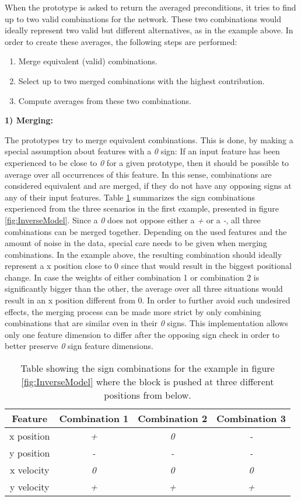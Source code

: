 When the prototype is asked to return the averaged preconditions, it tries to find up to two valid combinations for the network. These two combinations would ideally represent two valid but different alternatives, as in the example above. 
In order to create these averages, the following steps are performed:
\begin{enumerate}
\item Merge equivalent (valid) combinations.
\item Select up to two merged combinations with the highest contribution.
\item Compute averages from these two combinations.
\end{enumerate}

\textbf{1) Merging:}

The prototypes try to merge equivalent combinations. This is done, by making a special assumption about features with a \textit{0} sign: If an input feature has been experienced to be close to \textit{0} for a given prototype, then it should be possible to average over all occurrences of this feature. 
In this sense, combinations are considered equivalent and are merged, if they do not have any opposing signs at any of their input features.
Table \ref{tab:signCombinations2} summarizes the sign combinations experienced from the three scenarios in the first example, presented in figure \ref{fig:InverseModel}.
Since a \textit{0} does not oppose either a \textit{+} or a \textit{-}, all three combinations can be merged together.
Depending on the used features and the amount of noise in the data, special care needs to be given when merging combinations. In the example above, the resulting combination should ideally represent a x position close to 0 since that would result in the biggest positional change. In case the weights of either combination 1 or combination 2 is significantly bigger than the other, the average over all three situations would result in an x position different from 0.
In order to further avoid such undesired effects, the merging process can be made more strict by only combining combinations that are similar even in their \textit{0} signs.
This implementation allows only one feature dimension to differ after the opposing sign check in order to better preserve \textit{0} sign feature dimensions.

\begin{table}
	\centering
	\begin{tabular}{|c|c|c|c|}
		\hline Feature & Combination 1 & Combination 2 & Combination 3 \\ 
		\hline x position & \textit{+} & \textit{0} & \textit{-} \\ 
		\hline y position & \textit{-} & \textit{-} & \textit{-} \\ 
		\hline x velocity & \textit{0} & \textit{0} & \textit{0} \\
		\hline y velocity & \textit{+} & \textit{+} & \textit{+} \\ 
		\hline 
	\end{tabular} 
	\caption{Table showing the sign combinations for the example in figure \ref{fig:InverseModel} where the block is pushed at three different positions from below.}
	\label{tab:signCombinations2}
\end{table}

